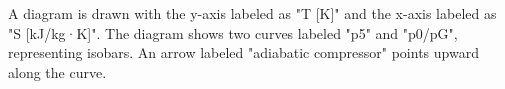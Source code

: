 A diagram is drawn with the y-axis labeled as "T [K]" and the x-axis labeled as "S [kJ/kg·K]". The diagram shows two curves labeled "p5" and "p0/pG", representing isobars. An arrow labeled "adiabatic compressor" points upward along the curve.
